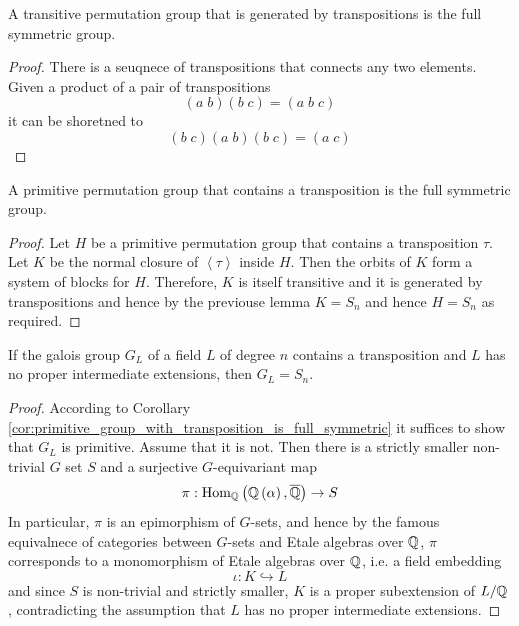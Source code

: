 \documentclass[../main.tex]{subfiles}
\begin{document}
\begin{lemma}
  A transitive permutation group that is generated by transpositions is the full symmetric group.
\end{lemma}
\begin{proof}

  There is a seuqnece of transpositions that connects any two elements.
  Given a product of a pair of transpositions 
  \[
    \left( a \; b \right) \left( b \; c \right) = \left( a \; b \; c \right)
  \]
  it can be shoretned to 
  \[
    \left( b \; c \right) \left( a \; b \right) \left( b \; c \right) = \left( a \; c \right) 
  \]
\end{proof}
\begin{corollary}
  \label{cor:primitive_group_with_transposition_is_full_symmetric}
  A primitive permutation group that contains a transposition is the full symmetric group.
\end{corollary}
\begin{proof}

  Let $H$ be a primitive permutation group that contains a transposition $\tau$.
  Let $K$ be the normal closure of $\left< \tau \right>$ inside $H$.
  Then the orbits of $K$ form a system of blocks for $H$.
  Therefore, $K$ is itself transitive and it is generated by transpositions and hence by the previouse lemma $K = S_n$ and hence $H = S_n$ as required.
\end{proof}
\begin{corollary}
  \label{cor:galois_group_with_transposition_ando_intermediate_extensions_is_full_symmetric}
  If the galois group $G_L$ of a field $L$ of degree $n$ contains a transposition and $L$ has no proper intermediate extensions, then $G_L = S_n$.
\end{corollary}
\begin{proof}
  According to Corollary \ref{cor:primitive_group_with_transposition_is_full_symmetric} it suffices to show that $G_L$ is primitive.
  Assume that it is not.
  Then there is a strictly smaller non-trivial $G$ set $S$ and a surjective $G$-equivariant map
  \[
    \pi : \operatorname{\rm Hom}_{\mathbb{Q}}\left( \mathbb{Q}\left( \alpha \right), \overline{\mathbb{Q}} \right) \to S
  \]
  In particular, $\pi$ is an epimorphism of $G$-sets, and hence by the famous equivalnece of categories between $G$-sets and Etale algebras over $\mathbb{Q}$, $\pi$ corresponds to a monomorphism of Etale algebras over $\mathbb{Q}$, i.e. a field embedding 
  \[
    \iota : K \hookrightarrow L
  \]
  and since $S$ is non-trivial and strictly smaller, $K$ is a proper subextension of $L/\mathbb{Q}$, contradicting the assumption that $L$ has no proper intermediate extensions.
\end{proof}
\end{document}

